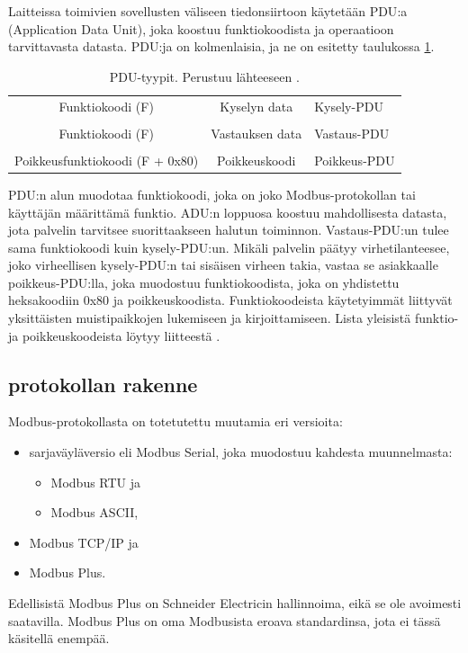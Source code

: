     Laitteissa toimivien sovellusten väliseen tiedonsiirtoon käytetään \gls{PDU}:a (Application Data Unit), joka koostuu funktiokoodista ja operaatioon tarvittavasta datasta. \gls{PDU}:ja on kolmenlaisia, ja ne on esitetty taulukossa \ref{pdu}.
    \begin{table}[h]
      \centering
      \caption[\gls{PDU}-tyypit.]{\gls{PDU}-tyypit. Perustuu lähteeseen \parencite{modbusAppSpec}.}
      \begin{tabular}{ccl}
        \cellcolor{green}Funktiokoodi (F)              & \cellcolor{green}Kyselyn data    & Kysely-PDU   \\
                                                       &                                  &              \\
        \cellcolor{green}Funktiokoodi (F)              & \cellcolor{green}Vastauksen data & Vastaus-PDU  \\
                                                       &                                  &              \\
        \cellcolor{red}Poikkeusfunktiokoodi (F + 0x80) & \cellcolor{red}Poikkeuskoodi     & Poikkeus-PDU \\
      \end{tabular}
      \label{pdu}
    \end{table}
    \gls{PDU}:n alun muodotaa funktiokoodi, joka on joko Modbus-protokollan tai käyttäjän määrittämä funktio. ADU:n loppuosa koostuu mahdollisesta datasta, jota palvelin tarvitsee suorittaakseen halutun toiminnon. Vastaus-PDU:un tulee sama funktiokoodi kuin kysely-PDU:un. Mikäli palvelin päätyy virhetilanteesee, joko virheellisen kysely-PDU:n tai sisäisen virheen takia, vastaa se asiakkaalle poikkeus-PDU:lla, joka muodostuu funktiokoodista, joka on yhdistettu heksakoodiin 0x80 ja poikkeuskoodista.\parencite{modbusAppSpec} Funktiokoodeista käytetyimmät liittyvät yksittäisten muistipaikkojen lukemiseen ja kirjoittamiseen\parencite{DincerRosen}. Lista yleisistä funktio- ja poikkeuskoodeista löytyy liitteestä .


  \subsection{protokollan rakenne}

    Modbus-protokollasta on totetutettu muutamia eri versioita:
    \begin{itemize}
      \item sarjaväyläversio eli Modbus Serial, joka muodostuu kahdesta muunnelmasta:
      \begin{itemize}
        \item Modbus \gls{RTU} ja
        \item Modbus ASCII,
      \end{itemize}
      \item Modbus TCP/IP ja
      \item Modbus Plus.
      \parencite{modbusAppSpec}
    \end{itemize}
    Edellisistä Modbus Plus on Schneider Electricin hallinnoima, eikä se ole avoimesti saatavilla. Modbus Plus on oma Modbusista eroava standardinsa, jota ei tässä käsitellä enempää.\parencite{seCom}

